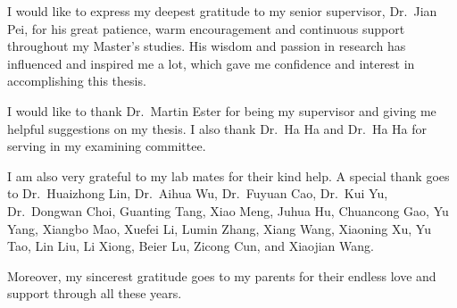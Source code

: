 
%
%

I would like to express my deepest gratitude to my senior supervisor, Dr.~Jian Pei, for his great patience, warm encouragement and continuous support throughout my Master's studies. His wisdom and passion in research has influenced and inspired me a lot, which gave me confidence and interest in accomplishing this thesis. 

I would like to thank Dr.~Martin Ester for being my supervisor and giving me helpful suggestions on my thesis. I also thank Dr.~Ha Ha and Dr.~Ha Ha for serving in my examining committee.  

I am also very grateful to my lab mates for their kind help. A special thank goes to Dr.~Huaizhong Lin, Dr.~Aihua Wu, Dr.~Fuyuan Cao, Dr.~Kui Yu,  Dr.~Dongwan Choi, Guanting Tang, Xiao Meng, Juhua Hu, Chuancong Gao, Yu Yang, Xiangbo Mao, Xuefei Li, Lumin Zhang, Xiang Wang, Xiaoning Xu, Yu Tao, Lin Liu, Li Xiong, Beier Lu, Zicong Cun, and Xiaojian Wang.

Moreover, my sincerest gratitude goes to my parents for their endless love and support through all these years.

